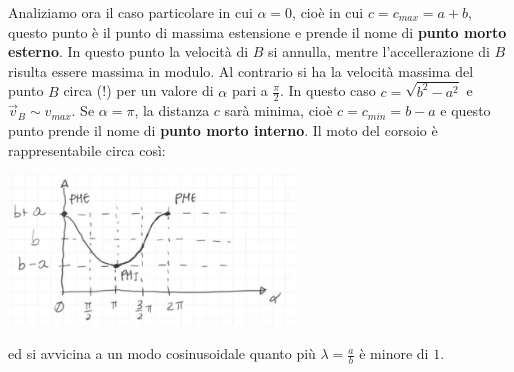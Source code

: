 \newline
Analiziamo ora il caso particolare in cui $\alpha = 0$, cioè in cui $c = c_{max} = a+b$, questo punto è il punto di massima estensione e prende il nome di \textbf{punto morto esterno}.\newline
In questo punto la velocità di $B$ si annulla, mentre l'accellerazione di $B$ risulta essere massima in modulo.\newline
\newline
Al contrario si ha la velocità massima del punto $B$ circa (!) per un valore di $\alpha$ pari a $\frac{\pi}{2}$. In questo caso $c = \sqrt{b^2 - a^2}$ e $\vec{v}_B \sim v_{max}$.\newline
\newline
Se $\alpha = \pi$, la distanza $c$ sarà minima, cioè $c = c_{min} = b-a$ e questo punto prende il nome di \textbf{punto morto interno}.\newline
\newline
Il moto del corsoio è rappresentabile circa così:
\begin{center}
    \includegraphics[height=4cm]{../lezione5/img3.JPG}
\end{center}
ed si avvicina a un modo cosinusoidale quanto più $\lambda = \frac{a}{b}$ è minore di $1$.
